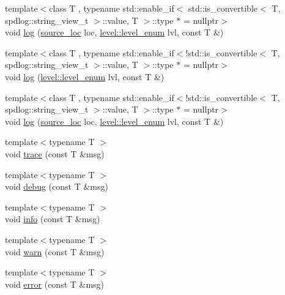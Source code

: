 \begin{DoxyCompactItemize}
\item 
{\footnotesize template$<$class T , typename std\+::enable\+\_\+if$<$ std\+::is\+\_\+convertible$<$ T, spdlog\+::string\+\_\+view\+\_\+t $>$\+::value, T $>$\+::type $\ast$  = nullptr$>$ }\\void \hyperlink{classspdlog_1_1logger_a4ad269959d007dcbe38cdb3c4e70d85b}{log} (\hyperlink{structspdlog_1_1source__loc}{source\+\_\+loc} loc, \hyperlink{namespacespdlog_1_1level_a35f5227e5daf228d28a207b7b2aefc8b}{level\+::level\+\_\+enum} lvl, const T \&)
\item 
{\footnotesize template$<$class T , typename std\+::enable\+\_\+if$<$!std\+::is\+\_\+convertible$<$ T, spdlog\+::string\+\_\+view\+\_\+t $>$\+::value, T $>$\+::type $\ast$  = nullptr$>$ }\\void \hyperlink{classspdlog_1_1logger_a706ca9501457bdda5562cf0dffeca712}{log} (\hyperlink{namespacespdlog_1_1level_a35f5227e5daf228d28a207b7b2aefc8b}{level\+::level\+\_\+enum} lvl, const T \&)
\item 
{\footnotesize template$<$class T , typename std\+::enable\+\_\+if$<$!std\+::is\+\_\+convertible$<$ T, spdlog\+::string\+\_\+view\+\_\+t $>$\+::value, T $>$\+::type $\ast$  = nullptr$>$ }\\void \hyperlink{classspdlog_1_1logger_a4ad269959d007dcbe38cdb3c4e70d85b}{log} (\hyperlink{structspdlog_1_1source__loc}{source\+\_\+loc} loc, \hyperlink{namespacespdlog_1_1level_a35f5227e5daf228d28a207b7b2aefc8b}{level\+::level\+\_\+enum} lvl, const T \&)
\item 
{\footnotesize template$<$typename T $>$ }\\void \hyperlink{classspdlog_1_1logger_a66e008d30a46c33283c4546f3851a80a}{trace} (const T \&msg)
\item 
{\footnotesize template$<$typename T $>$ }\\void \hyperlink{classspdlog_1_1logger_aca96637e71ab459738ccc7287be28c2e}{debug} (const T \&msg)
\item 
{\footnotesize template$<$typename T $>$ }\\void \hyperlink{classspdlog_1_1logger_a1e1dff0caa0d1bf072739dfcc1e331d8}{info} (const T \&msg)
\item 
{\footnotesize template$<$typename T $>$ }\\void \hyperlink{classspdlog_1_1logger_af9153fa3a0735a535ea56f684dc53256}{warn} (const T \&msg)
\item 
{\footnotesize template$<$typename T $>$ }\\void \hyperlink{classspdlog_1_1logger_a9ce73acaa12b7dbbecde6ac3bc7353e5}{error} (const T \&msg)

\end{DoxyCompactItemize}
